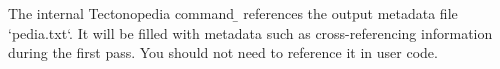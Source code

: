 
The internal Tectonopedia command \b{\string\pediaIndex} references the output
metadata file \tex`pedia.txt`. It will be filled with metadata such as
cross-referencing information during the first pass. You should not need to
reference it in user code.
